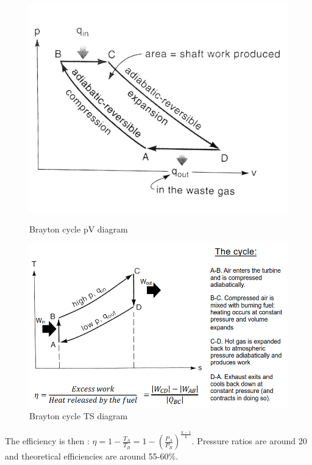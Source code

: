\documentclass[../main.tex]{subfiles}
\begin{document}
\begin{figure}[hbt!]
\begin{minipage}{.5\textwidth}
    \centering
    \includegraphics[width=\linewidth]{IMAGES/Renewable/Screenshot from 2025-03-04 17-16-30.png}
    \caption{Brayton cycle pV diagram}
\end{minipage}
\hfill
\begin{minipage}{.5\textwidth}
    \centering
    \includegraphics[width=\linewidth]{IMAGES/Renewable/Screenshot from 2025-03-04 17-17-56.png}
    \caption{Brayton cycle TS diagram}
\end{minipage}
\end{figure}

The efficiency is then : $\eta = 1-\frac{T_A}{T_B} = 1-(\frac{P_A}{P_B})^{\frac{k-1}{k}}$. Pressure ratios are around 20 and theoretical efficiencies are around 55-60\%.\\
\end{document}
